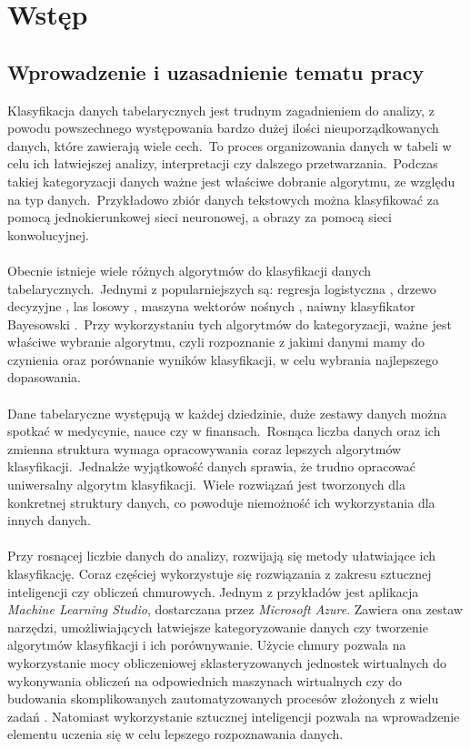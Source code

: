 \chapter{Wstęp}

\section{Wprowadzenie i uzasadnienie tematu pracy}
Klasyfikacja danych tabelarycznych jest trudnym zagadnieniem do analizy, z powodu powszechnego występowania bardzo dużej ilości nieuporządkowanych danych, które zawierają wiele cech.\ To proces organizowania danych w tabeli w celu ich łatwiejszej analizy, interpretacji czy dalszego przetwarzania.\ Podczas takiej kategoryzacji danych ważne jest właściwe dobranie algorytmu, ze względu na typ danych.\ Przykładowo zbiór danych tekstowych można klasyfikować za pomocą jednokierunkowej sieci neuronowej, a obrazy za pomocą sieci konwolucyjnej.\
\\ \\
Obecnie istnieje wiele różnych algorytmów do klasyfikacji danych tabelarycznych.\ Jednymi z popularniejszych są: regresja logistyczna , drzewo decyzyjne , las losowy , maszyna wektorów nośnych , naiwny klasyfikator Bayesowski .\ Przy wykorzystaniu tych algorytmów do kategoryzacji, ważne jest właściwe wybranie algorytmu, czyli rozpoznanie z jakimi danymi mamy do czynienia oraz porównanie wyników klasyfikacji, w celu wybrania najlepszego dopasowania.
\\ \\
Dane tabelaryczne występują w każdej dziedzinie, duże zestawy danych można spotkać w medycynie, nauce czy w finansach.\ Rosnąca liczba danych oraz ich zmienna struktura wymaga opracowywania coraz lepszych algorytmów klasyfikacji.\ Jednakże wyjątkowość danych sprawia, że trudno opracować uniwersalny algorytm klasyfikacji.\ Wiele rozwiązań jest tworzonych dla konkretnej struktury danych, co powoduje niemożność ich wykorzystania dla innych danych.
\\ \\
Przy rosnącej liczbie danych do analizy, rozwijają się metody ułatwiające ich klasyfikację. Coraz częściej wykorzystuje się rozwiązania z zakresu sztucznej inteligencji czy obliczeń chmurowych. Jednym z przykładów jest aplikacja \textit{Machine Learning Studio},  dostarczana przez \textit{Microsoft Azure}. Zawiera ona zestaw narzędzi, umożliwiających łatwiejsze kategoryzowanie danych czy tworzenie algorytmów klasyfikacji i ich porównywanie. Użycie chmury pozwala na wykorzystanie mocy obliczeniowej sklasteryzowanych jednostek wirtualnych do wykonywania obliczeń na odpowiednich maszynach wirtualnych czy do budowania skomplikowanych zautomatyzowanych procesów złożonych z wielu zadań . Natomiast wykorzystanie sztucznej inteligencji pozwala na wprowadzenie elementu uczenia się w celu lepszego rozpoznawania danych.
